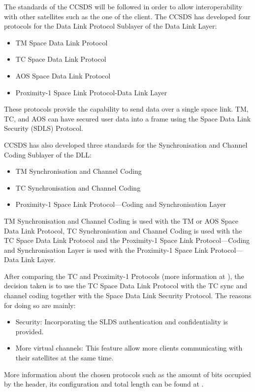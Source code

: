 The standards of the CCSDS will be followed in order to allow interoperability with other satellites such as the one of the client. The CCSDS has developed four protocols for the Data Link Protocol Sublayer of the Data Link Layer\cite{Secretariat2014}:

\begin{itemize}
\item TM Space Data Link Protocol
\item TC Space Data Link Protocol
\item AOS Space Data Link Protocol
\item Proximity-1 Space Link Protocol-Data Link Layer
\end{itemize}

These protocols provide the capability to send data over a single space link. TM, TC, and AOS can have secured user data into a frame using the Space Data Link Security (SDLS) Protocol.

CCSDS has also developed three standards for the Synchronisation and Channel Coding Sublayer of the DLL:
\begin{itemize}
\item TM Synchronisation and Channel Coding
\item TC Synchronisation and Channel Coding
\item Proximity-1 Space Link Protocol—Coding and Synchronisation Layer
\end{itemize}

TM Synchronisation and Channel Coding is used with the TM or AOS Space Data Link Protocol, TC Synchronisation and Channel Coding is used with the TC Space Data Link Protocol and the Proximity-1 Space Link Protocol—Coding and Synchronisation Layer is used with the Proximity-1 Space Link Protocol—Data Link Layer. 

After comparing the TC and Proximity-1 Protocols (more information at \cite[Chapter 1, Section 1]{annex3}), the decision taken is to use the TC Space Data Link Protocol with the TC sync and channel coding together with the Space Data Link Security Protocol. The reasons for doing so are mainly:

\begin{itemize}
\item Security: Incorporating the SLDS authentication and confidentiality is provided.
\item More virtual channels: This feature allow more clients communicating with their satellites at the same time.
\end{itemize}

More information about the chosen protocols such as the amount of bits occupied by the header, its configuration and total length can be found at \cite[Chapter 1, Section 1]{annex3}.